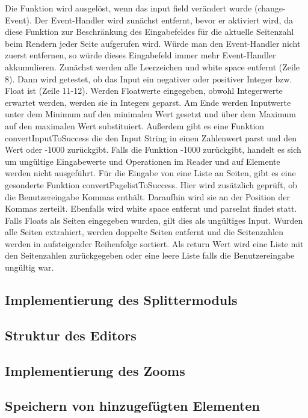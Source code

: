 Die Funktion wird ausgelöst, wenn das input field verändert wurde (change-Event). Der Event-Handler wird zunächst entfernt, bevor er aktiviert wird, da diese Funktion zur Beschränkung des Eingabefeldes für die aktuelle Seitenzahl beim Rendern jeder Seite aufgerufen wird. Würde man den Event-Handler nicht zuerst entfernen, so würde dieses Eingabefeld immer mehr Event-Handler akkumulieren. Zunächst werden alle Leerzeichen und white space entfernt (Zeile 8). Dann wird getestet, ob das Input ein negativer oder positiver Integer bzw. Float ist (Zeile 11-12). Werden Floatwerte eingegeben, obwohl Integerwerte erwartet werden, werden sie in Integers geparst. Am Ende werden Inputwerte unter dem Minimum auf den minimalen Wert gesetzt und über dem Maximum auf den maximalen Wert substituiert. Außerdem gibt es eine Funktion convertInputToSuccess die den Input String in einen Zahlenwert parst und den Wert oder -1000 zurückgibt. Falls die Funktion -1000 zurückgibt, handelt es sich um ungültige Eingabewerte und Operationen im Reader und auf Elemente werden nicht ausgeführt. Für die Eingabe von eine Liste an Seiten, gibt es eine gesonderte Funktion convertPagelistToSuccess. Hier wird zusätzlich geprüft, ob die Benutzereingabe Kommas enthält. Daraufhin wird sie an der Position der Kommas zerteilt. Ebenfalls wird white space entfernt und parseInt findet statt. Falls Floats als Seiten eingegeben wurden, gilt dies als ungültiges Input. Wurden alle Seiten extrahiert, werden doppelte Seiten entfernt und die Seitenzahlen werden in aufsteigender Reihenfolge sortiert. Als return Wert wird eine Liste mit den Seitenzahlen zurückgegeben oder eine leere Liste falls die Benutzereingabe ungültig war.

\subsection{Implementierung des Splittermoduls}

\subsection{Struktur des Editors}

\subsection{Implementierung des Zooms}

\subsection{Speichern von hinzugefügten Elementen}